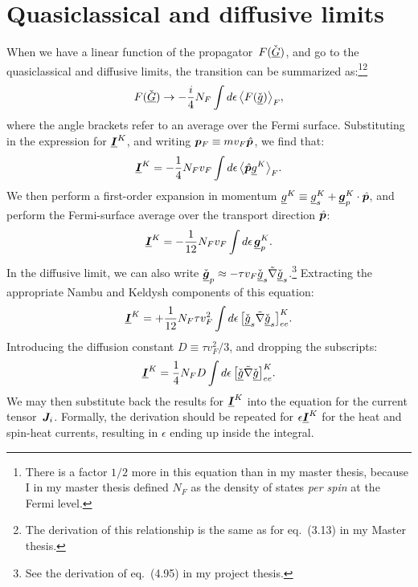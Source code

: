 \section{Quasiclassical and diffusive limits}
When we have a linear function of the propagator~$F(\UV{G})$, and go to the quasiclassical and diffusive limits, the transition can be summarized as:\footnote{There is a factor $1/2$ more in this equation than in my master thesis, because I in my master thesis defined $N_F$ as the density of states \emph{per spin} at the Fermi level.}\footnote{The derivation of this relationship is the same as for eq.~(3.13) in my Master thesis.}
\begin{align}
  F(\UV{G}) \rightarrow -\frac{i}{4}N_F \int\d\epsilon\,\avg[\big]{F(\UV{g})}_F,
\end{align}
where the angle brackets refer to an average over the Fermi surface.
Substituting in the expression for $\BU{I}^K$, and writing $\B{p}_F \equiv mv_F\hat{\B{p}}$, we find that:
\begin{align}
  \BU{I}^K = -\frac{1}{4}N_Fv_F \int\d\epsilon\,\avg[\big]{\hat{\B{p}}\U{g}^K}_F.
\end{align}
We then perform a first-order expansion in momentum $\U{g}^K \equiv \U{g}_s^K + \BU{g}_p^K\cdot\hat{\B{p}}$, and perform the Fermi-surface average over the transport direction $\hat{\B{p}}$:
\begin{align}
  \BU{I}^K = -\frac{1}{12}N_Fv_F \int\d\epsilon\,\BU{g}_p^K.
\end{align}
In the diffusive limit, we can also write $\BUV{g}_p \approx -\tau v_F\UV{g}_s \tc\nabla \UV{g}_s$.\footnote{See the derivation of eq.~(4.95) in my project thesis.}
Extracting the appropriate Nambu and Keldysh components of this equation:
\begin{align}
  \BU{I}^K = +\frac{1}{12}N_F\tau v_F^2 \int\d\epsilon\, \big[ \UV{g}_s\tc\nabla\UV{g}_s \big]^K_{ee}.
\end{align}
Introducing the diffusion constant $D \equiv \tau v_F^2/3$, and dropping the subscripts:
\begin{align}
  \BU{I}^K = \frac{1}{4}N_FD \int\d\epsilon\, \big[ \UV{g}\tc\nabla\UV{g} \big]^K_{ee}.
\end{align}
We may then substitute back the results for $\BU{I}^K$ into the equation for the current tensor~$\B{J}_i$.
Formally, the derivation should be repeated for $\epsilon \BU{I}^K$ for the heat and spin-heat currents, resulting in $\epsilon$ ending up inside the integral.

